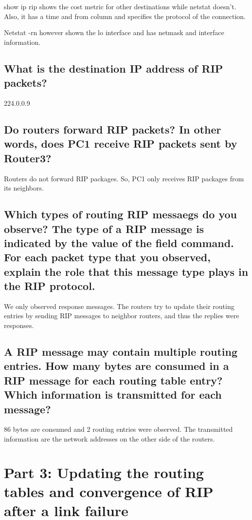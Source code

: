 \documentclass[a4paper, 11pt]{article}
\begin{document}
show ip rip shows the cost metric for other destinations while netstat doesn't. 
Also, it has a time and from column and specifies the protocol of the connection.

Netstat -rn however shown the lo interface and has netmask and interface information.

\subsection{What is the destination IP address of RIP packets?}

224.0.0.9

\subsection{Do routers forward RIP packets? In other words, does PC1 receive RIP packets sent by Router3? }

Routers do not forward RIP packages. So, PC1 only receives RIP packages from its neighbors.

\subsection{Which types of routing RIP messaegs do you observe? The type of a RIP message is indicated by the value of the field command. For each packet type that you observed, explain the role that this message type plays in the RIP protocol. }

We only observed response messages. The routers try to update their routing entries by sending RIP messages to neighbor routers, and thus the replies were responses.

\subsection{A RIP message may contain multiple routing entries. How many bytes are consumed in a RIP message for each routing table entry? Which information is transmitted for each message? }

86 bytes are consumed and 2 routing entries were observed. The transmitted information are the network addresses on the other side of the routers.

\section{Part 3: Updating the routing tables and convergence of RIP after a link failure}
\end{document}

